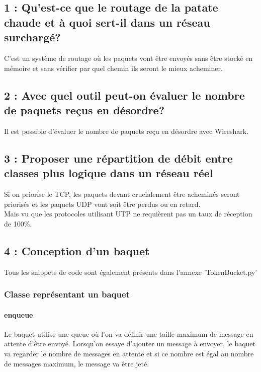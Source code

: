 \documentclass{article}
\begin{document}
\subsection*{1 : Qu'est-ce que le routage de la patate chaude et à quoi sert-il dans un réseau surchargé?}

C'est un système de routage où les paquets vont être envoyés sans être stocké en mémoire et sans vérifier par quel chemin ils seront le mieux acheminer. \cite{HotPotato}

\subsection*{2 : Avec quel outil peut-on évaluer le nombre de paquets reçus en désordre?}

Il est possible d'évaluer le nombre de paquets reçu en désordre avec Wireshark.


\subsection*{3 : Proposer une répartition de débit entre classes plus logique dans un réseau réel}

Si on priorise le TCP, les paquets devant crucialement être acheminés seront priorisés et les paquets UDP vont soit être perdus ou en retard. \\

Mais vu que les protocoles utilisant UTP ne requièrent pas un taux de réception de 100\%. 

\subsection*{4 : Conception d'un baquet}

Tous les snippets de code sont également présents dans l'annexe 'TokenBucket.py'

\subsubsection{Classe représentant un baquet}

\paragraph{enqueue}

Le baquet utilise une queue où l'on va définir une taille maximum de message en attente d'être envoyé. Lorsqu'on essaye d'ajouter un message à envoyer, le baquet va regarder le nombre de messages en attente et si ce nombre est égal au nombre de messages maximum, le message va être jeté.\\
\end{document}
